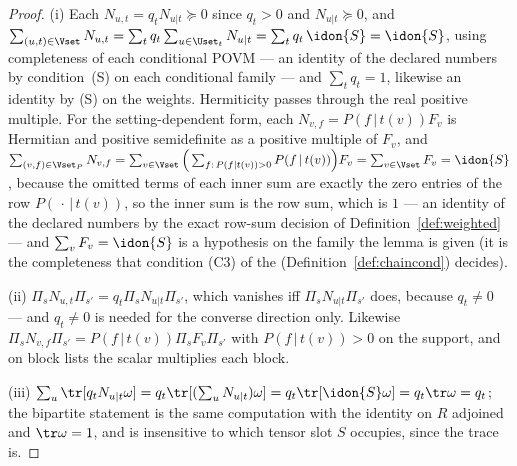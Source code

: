 \begin{proof}
(i) Each $N_{u,t}=q_tN_{u|t}\succeq0$ since $q_t>0$ and $N_{u|t}\succeq0$, and
$\sum_{(u,t)\in\Vset}N_{u,t}=\sum_{t}q_t\sum_{u\in\Uset_t}N_{u|t}
=\sum_tq_t\,\idon{S}=\idon{S}$, using completeness of each conditional POVM ---
an identity of the declared numbers by condition~(S) on each conditional family
--- and $\sum_tq_t=1$, likewise an identity by (S) on the weights. Hermiticity
passes through the real positive multiple. For the setting-dependent form,
each $N_{v,f}=P(f\,|\,t(v))F_v$ is Hermitian and positive semidefinite as a
positive multiple of $F_v$, and
$\sum_{(v,f)\in\Vset_P}N_{v,f}
=\sum_{v\in\Vset}\Big(\sum_{f:\,P(f|t(v))>0}P(f\,|\,t(v))\Big)F_v
=\sum_{v\in\Vset}F_v=\idon{S}$, because the omitted terms of each inner sum
are exactly the zero entries of the row $P(\,\cdot\,|\,t(v))$, so the inner
sum is the row sum, which is $1$ --- an identity of the declared numbers by
the exact row-sum decision of Definition~\ref{def:weighted} --- and
$\sum_vF_v=\idon{S}$ is a hypothesis on the family the lemma is given (it is
the completeness that condition (C3) of the
 (Definition~\ref{def:chaincond})
decides).

(ii) $\Pi_sN_{u,t}\Pi_{s'}=q_t\Pi_sN_{u|t}\Pi_{s'}$, which
vanishes iff $\Pi_sN_{u|t}\Pi_{s'}$ does, because $q_t\ne0$ --- and $q_t\ne0$
is needed for the converse direction only. Likewise
$\Pi_sN_{v,f}\Pi_{s'}=P(f\,|\,t(v))\Pi_sF_v\Pi_{s'}$ with
$P(f\,|\,t(v))>0$ on the support, and on block lists the scalar multiplies
each block.

(iii) $\sum_{u}\tr[q_tN_{u|t}\omega]=q_t\tr[(\sum_uN_{u|t})\omega]
=q_t\tr[\idon{S}\omega]=q_t\tr\omega=q_t$; the bipartite statement is the same
computation with the identity on $R$ adjoined and $\tr\omega=1$, and is
insensitive to which tensor slot $S$ occupies, since the trace is.


\end{proof}
